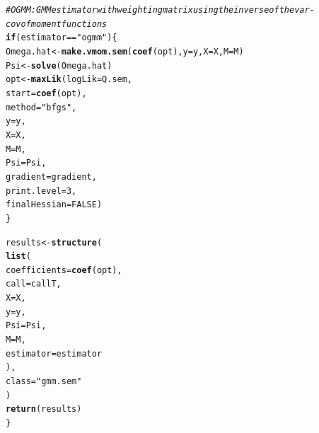 \documentclass[english,12pt]{book}\usepackage[]{graphicx}\usepackage[]{xcolor}
\makeatletter
\newcommand{\hlnum}[1]{\textcolor[rgb]{0.686,0.059,0.569}{#1}}%
\newcommand{\hlsng}[1]{\textcolor[rgb]{0.192,0.494,0.8}{#1}}%
\newcommand{\hlcom}[1]{\textcolor[rgb]{0.678,0.584,0.686}{\textit{#1}}}%
\newcommand{\hlopt}[1]{\textcolor[rgb]{0,0,0}{#1}}%
\newcommand{\hldef}[1]{\textcolor[rgb]{0.345,0.345,0.345}{#1}}%
\newcommand{\hlkwa}[1]{\textcolor[rgb]{0.161,0.373,0.58}{\textbf{#1}}}%
\newcommand{\hlkwb}[1]{\textcolor[rgb]{0.69,0.353,0.396}{#1}}%
\newcommand{\hlkwc}[1]{\textcolor[rgb]{0.333,0.667,0.333}{#1}}%
\newcommand{\hlkwd}[1]{\textcolor[rgb]{0.737,0.353,0.396}{\textbf{#1}}}%
\newenvironment{kframe}{%
 \def\at@end@of@kframe{}%
 \ifinner\ifhmode%
  \def\at@end@of@kframe{\end{minipage}}%
  \begin{minipage}{\columnwidth}%
 \fi\fi%
 \def\FrameCommand##1{\hskip\@totalleftmargin \hskip-\fboxsep
 \colorbox{shadecolor}{##1}\hskip-\fboxsep
     \hskip-\linewidth \hskip-\@totalleftmargin \hskip\columnwidth}%
 \MakeFramed {\advance\hsize-\width
   \@totalleftmargin\z@ \linewidth\hsize
   \@setminipage}}%
 {\par\unskip\endMakeFramed%
 \at@end@of@kframe}
\newenvironment{knitrout}{}{} %
\makeatother
\begin{document}
\begin{knitrout}
\begin{kframe}
\begin{alltt}
  \hlcom{# OGMM: GMM estimator with weighting matrix using the inverse of the var-cov of moment functions}
  \hlkwa{if} \hldef{(estimator} \hlopt{==} \hlsng{"ogmm"}\hldef{)\{}
    \hldef{Omega.hat} \hlkwb{<-} \hlkwd{make.vmom.sem}\hldef{(}\hlkwd{coef}\hldef{(opt),} \hlkwc{y} \hldef{= y,} \hlkwc{X} \hldef{= X,} \hlkwc{M} \hldef{= M)}
    \hldef{Psi}       \hlkwb{<-} \hlkwd{solve}\hldef{(Omega.hat)}
    \hldef{opt}       \hlkwb{<-} \hlkwd{maxLik}\hldef{(}\hlkwc{logLik} \hldef{= Q.sem,}
                        \hlkwc{start} \hldef{=} \hlkwd{coef}\hldef{(opt),}
                        \hlkwc{method} \hldef{=} \hlsng{"bfgs"}\hldef{,}
                        \hlkwc{y} \hldef{= y,}
                        \hlkwc{X} \hldef{= X,}
                        \hlkwc{M} \hldef{= M,}
                        \hlkwc{Psi} \hldef{= Psi,}
                        \hlkwc{gradient} \hldef{= gradient,}
                        \hlkwc{print.level} \hldef{=} \hlnum{3}\hldef{,}
                        \hlkwc{finalHessian} \hldef{=} \hlnum{FALSE}\hldef{)}
  \hldef{\}}

  \hldef{results} \hlkwb{<-} \hlkwd{structure}\hldef{(}
    \hlkwd{list}\hldef{(}
      \hlkwc{coefficients} \hldef{=} \hlkwd{coef}\hldef{(opt),}
      \hlkwc{call}         \hldef{= callT,}
      \hlkwc{X}            \hldef{= X,}
      \hlkwc{y}            \hldef{= y,}
      \hlkwc{Psi}          \hldef{= Psi,}
      \hlkwc{M}            \hldef{= M,}
      \hlkwc{estimator}    \hldef{= estimator}
    \hldef{),}
    \hlkwc{class} \hldef{=} \hlsng{"gmm.sem"}
  \hldef{)}
  \hlkwd{return}\hldef{(results)}
\hldef{\}}
\end{alltt}
\end{kframe}
\end{knitrout}
\end{document}
